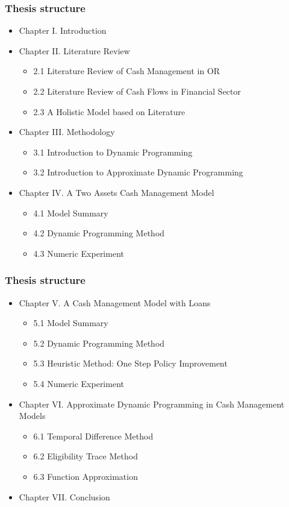 \documentclass{beamer}
\begin{document}
\begin{frame}
\frametitle{Thesis structure}


\begin{itemize}
\item Chapter I.	Introduction
\item Chapter II. Literature Review
\begin{itemize}
\item  2.1 Literature Review of Cash Management in OR
\item  2.2 Literature Review of  Cash Flows in Financial Sector
\item 2.3 A Holistic Model based on Literature
\end{itemize}
\item Chapter III. Methodology
\begin{itemize}
\item  3.1 Introduction to Dynamic Programming
\item  3.2 Introduction to Approximate Dynamic Programming
\end{itemize}
\item Chapter IV. A Two Assets Cash Management Model
\begin{itemize}
\item  4.1 Model Summary
\item  4.2 Dynamic Programming Method
\item 4.3 Numeric Experiment
\end{itemize}
\end{itemize}
\end{frame}


\begin{frame}
\frametitle{Thesis structure}


\begin{itemize}


\item Chapter V. A Cash Management Model with Loans
\begin{itemize}
\item  5.1 Model Summary
\item  5.2 Dynamic Programming Method
\item  5.3 Heuristic Method: One Step Policy Improvement
\item  5.4 Numeric Experiment
\end{itemize}

\item Chapter VI. Approximate Dynamic Programming in Cash Management Models
\begin{itemize}
\item  6.1 Temporal Difference Method
\item  6.2 Eligibility Trace Method
\item  6.3 Function Approximation
\end{itemize}
\item Chapter VII. Conclusion
\end{itemize}

\end{frame}
\end{document}

